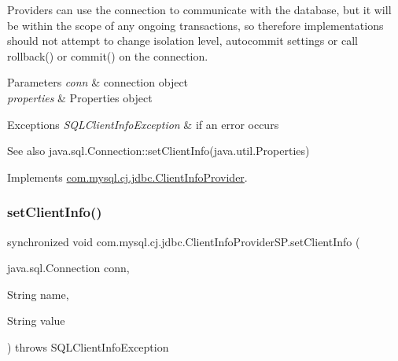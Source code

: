 Providers can use the connection to communicate with the database, but it will be within the scope of any ongoing transactions, so therefore implementations should not attempt to change isolation level, autocommit settings or call rollback() or commit() on the connection.


\begin{DoxyParams}{Parameters}
{\em conn} & connection object \\
\hline
{\em properties} & Properties object \\
\hline
\end{DoxyParams}

\begin{DoxyExceptions}{Exceptions}
{\em S\+Q\+L\+Client\+Info\+Exception} & if an error occurs\\
\hline
\end{DoxyExceptions}
\begin{DoxySeeAlso}{See also}
java.\+sql.\+Connection\+::set\+Client\+Info(java.\+util.\+Properties) 
\end{DoxySeeAlso}


Implements \mbox{\hyperlink{interfacecom_1_1mysql_1_1cj_1_1jdbc_1_1_client_info_provider_aa6e19d37534651d9916fb45ea7392044}{com.\+mysql.\+cj.\+jdbc.\+Client\+Info\+Provider}}.

\mbox{\label{classcom_1_1mysql_1_1cj_1_1jdbc_1_1_client_info_provider_s_p_a5f11c59093e5f448770a7f48fb17fcf2}} 
\subsubsection{\texorpdfstring{set\+Client\+Info()}{setClientInfo()}\hspace{0.1cm}{\footnotesize\ttfamily [2/2]}}
{\footnotesize\ttfamily synchronized void com.\+mysql.\+cj.\+jdbc.\+Client\+Info\+Provider\+S\+P.\+set\+Client\+Info (\begin{DoxyParamCaption}\item[{java.\+sql.\+Connection}]{conn,  }\item[{String}]{name,  }\item[{String}]{value }\end{DoxyParamCaption}) throws S\+Q\+L\+Client\+Info\+Exception}

